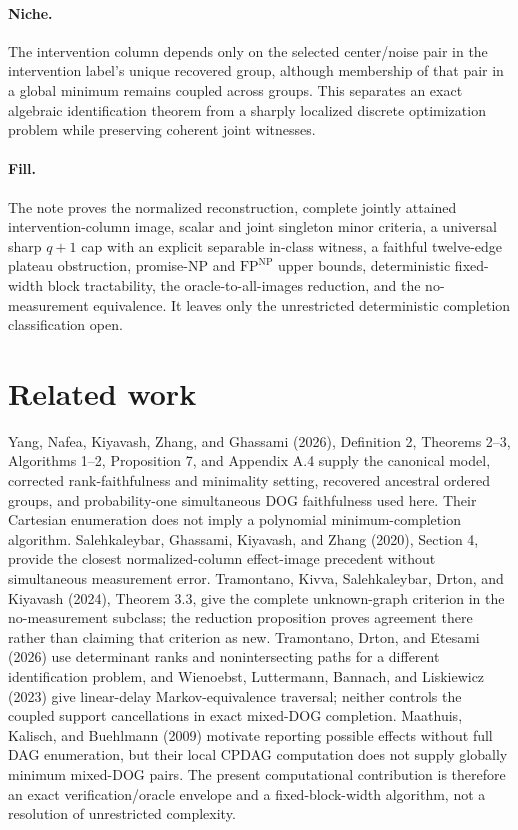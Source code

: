 \documentclass{article}
\begin{document}
\paragraph{Niche.} The intervention column depends only on the selected center/noise pair in the intervention label's unique recovered group, although membership of that pair in a global minimum remains coupled across groups. This separates an exact algebraic identification theorem from a sharply localized discrete optimization problem while preserving coherent joint witnesses.

\paragraph{Fill.} The note proves the normalized reconstruction, complete jointly attained intervention-column image, scalar and joint singleton minor criteria, a universal sharp \(q+1\) cap with an explicit separable in-class witness, a faithful twelve-edge plateau obstruction, promise-\(\mathrm{NP}\) and \(\mathrm{FP}^{\mathrm{NP}}\) upper bounds, deterministic fixed-width block tractability, the oracle-to-all-images reduction, and the no-measurement equivalence. It leaves only the unrestricted deterministic completion classification open.

\section{Related work}

Yang, Nafea, Kiyavash, Zhang, and Ghassami (2026), Definition 2, Theorems 2--3, Algorithms 1--2, Proposition 7, and Appendix A.4 supply the canonical model, corrected rank-faithfulness and minimality setting, recovered ancestral ordered groups, and probability-one simultaneous DOG faithfulness used here. Their Cartesian enumeration does not imply a polynomial minimum-completion algorithm. Salehkaleybar, Ghassami, Kiyavash, and Zhang (2020), Section 4, provide the closest normalized-column effect-image precedent without simultaneous measurement error. Tramontano, Kivva, Salehkaleybar, Drton, and Kiyavash (2024), Theorem 3.3, give the complete unknown-graph criterion in the no-measurement subclass; the reduction proposition proves agreement there rather than claiming that criterion as new. Tramontano, Drton, and Etesami (2026) use determinant ranks and nonintersecting paths for a different identification problem, and Wienoebst, Luttermann, Bannach, and Liskiewicz (2023) give linear-delay Markov-equivalence traversal; neither controls the coupled support cancellations in exact mixed-DOG completion. Maathuis, Kalisch, and Buehlmann (2009) motivate reporting possible effects without full DAG enumeration, but their local CPDAG computation does not supply globally minimum mixed-DOG pairs. The present computational contribution is therefore an exact verification/oracle envelope and a fixed-block-width algorithm, not a resolution of unrestricted complexity.
\end{document}
